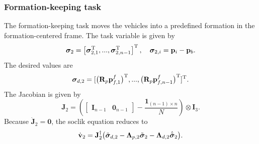 \subsubsection{Formation-keeping task}
The formation-keeping task moves the vehicles into a predefined formation in the formation-centered frame. The task variable is given by
\begin{equation}
    \bm{\sigma}_2 = \left[ \bm{\sigma}_{2,1}^{\mathrm{T}}, ..., \bm{\sigma}_{2,n-1}^{\mathrm{T}}\right]^{\mathrm{T}}, \quad \bm{\sigma}_{2,i}  = \mathbf{p}_i - \mathbf{p}_b.
\end{equation}
The desired values are
\begin{equation}
    \bm{\sigma}_{d,2} = [\bigl(\mathbf{R}_p \mathbf{p}_{f,1}^f\bigr)^{\mathrm{T}}, ..., \bigl(\mathbf{R}_p \mathbf{p}_{f,n-1}^f\bigr) ^{\mathrm{T}}] ^{\mathrm{T}}.
\end{equation}
The Jacobian is given by 
\begin{equation}
    \mathbf{J}_2 = \left(\begin{bmatrix}
        \mathbf{I}_{n-1} & \mathbf{0}_{n-1}
    \end{bmatrix} - \frac{\mathbf{1}_{(n-1) \times n}}{N}\right)\otimes \mathbf{I}_3.
\end{equation}
Because $\dot{\mathbf{J}}_2 = \mathbf{0}$, the \gls{soclik} equation reduces to
\begin{equation}\label{eq:formation_keeping_controller}
    \dot{\mathbf{v}}_2 = \mathbf{J}_2^\dagger \bigl(\ddot{\bm{\sigma}}_{d,2} - \mathbf{\Lambda}_{p,2}\Tilde{\bm{\sigma}}_2 - \mathbf{\Lambda}_{d,2} \dot{\Tilde{\bm{\sigma}}}_2\bigr).
\end{equation}

